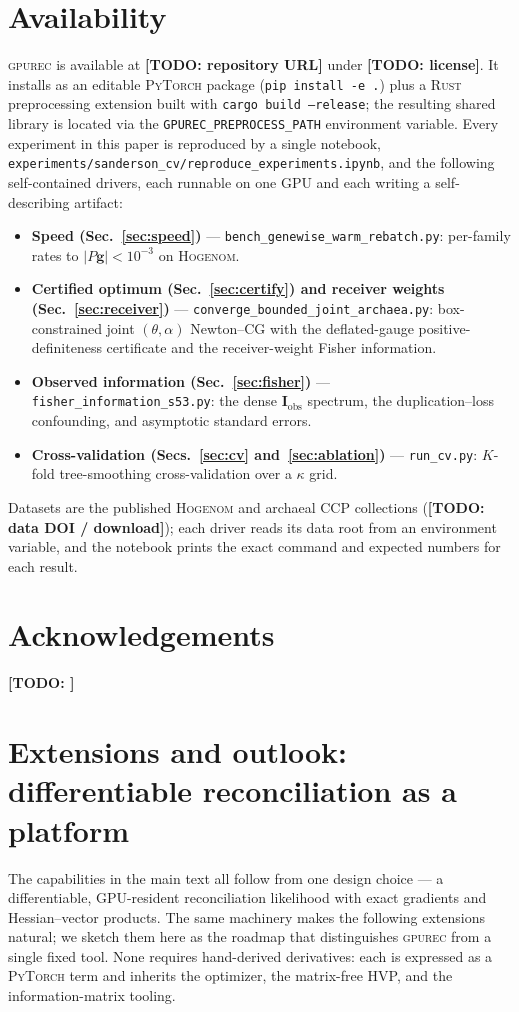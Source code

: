 \documentclass[11pt]{article}
\newcommand{\toolname}{\textsc{gpurec}\xspace}
\newcommand{\TODO}[1]{{\color{red!70!black}\textbf{[TODO: #1]}}}
\newcommand{\Fish}{\mathbf{I}}
\newcommand{\grad}{\mathbf{g}}
\begin{document}
\section*{Availability}
\toolname is available at \TODO{repository URL} under \TODO{license}. It installs
as an editable \textsc{PyTorch} package (\texttt{pip install -e .}) plus a
\textsc{Rust} preprocessing extension built with \texttt{cargo build --release};
the resulting shared library is located via the \texttt{GPUREC\_PREPROCESS\_PATH}
environment variable. Every experiment in this paper is reproduced by a single
notebook, \texttt{experiments/sanderson\_cv/reproduce\_experiments.ipynb}, and the
following self-contained drivers, each runnable on one GPU and each writing a
self-describing artifact:
\begin{itemize}[nosep]
\item \textbf{Speed (Sec.~\ref{sec:speed})} --- \texttt{bench\_genewise\_warm\_rebatch.py}:
  per-family rates to $|P\grad|<10^{-3}$ on \textsc{Hogenom}.
\item \textbf{Certified optimum (Sec.~\ref{sec:certify}) and receiver weights
  (Sec.~\ref{sec:receiver})} --- \texttt{converge\_bounded\_joint\_archaea.py}:
  box-constrained joint $(\theta,\alpha)$ Newton--CG with the deflated-gauge
  positive-definiteness certificate and the receiver-weight Fisher information.
\item \textbf{Observed information (Sec.~\ref{sec:fisher})} ---
  \texttt{fisher\_information\_s53.py}: the dense $\Fish_{\mathrm{obs}}$ spectrum,
  the duplication--loss confounding, and asymptotic standard errors.
\item \textbf{Cross-validation (Secs.~\ref{sec:cv} and~\ref{sec:ablation})} ---
  \texttt{run\_cv.py}: $K$-fold tree-smoothing cross-validation over a $\kappa$ grid.
\end{itemize}
Datasets are the published \textsc{Hogenom} and \citet{Davin2018} archaeal CCP
collections (\TODO{data DOI / download}); each driver reads its data root from an
environment variable, and the notebook prints the exact command and expected
numbers for each result.

\section*{Acknowledgements}
\TODO{}

\appendix
\section{Extensions and outlook: differentiable reconciliation as a platform}
\label{app:outlook}
The capabilities in the main text all follow from one design choice --- a
differentiable, GPU-resident reconciliation likelihood with exact gradients and
Hessian--vector products. The same machinery makes the following extensions
natural; we sketch them here as the roadmap that distinguishes \toolname from a
single fixed tool. None requires hand-derived derivatives: each is expressed as
a \textsc{PyTorch} term and inherits the optimizer, the matrix-free HVP, and the
information-matrix tooling.
\end{document}
